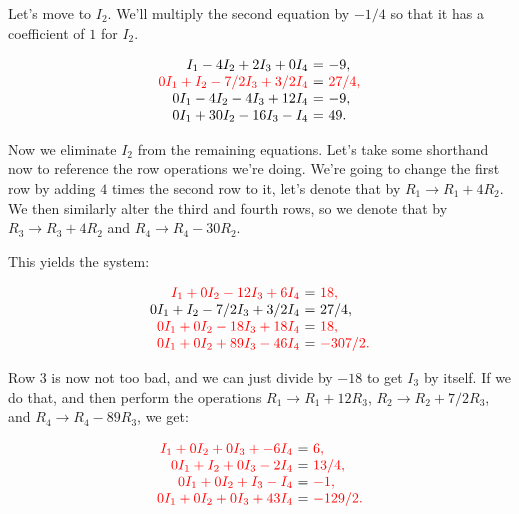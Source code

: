 \documentclass{ximera}
\begin{document}
\begin{exploration}
\begin{example}
\begin{solution}
  Let's move to $I_2$. We'll multiply the second equation by $-1/4$ so that it has a coefficient of $1$ for $I_2$.

  \begin{equation*}
    \begin{array}{r@{~}c@{~}l}
      I_1-4I_2+2I_3+0I_4&=&-9, \\
      \color{red}0I_1+I_2 - 7/2I_3 + 3/2I_4 &=& \color{red}27/4, \\
      0I_1 - 4I_2 - 4I_3 + 12I_4 &=& -9, \\
      0I_1+30I_2 - 16I_3 - I_4 &=& 49.
    \end{array}
  \end{equation*}

  Now we eliminate $I_2$ from the remaining equations. Let's take some shorthand now to reference the row operations we're doing. We're going to change the first row by adding $4$ times the second row to it, let's denote that by $R_1 \rightarrow R_1 + 4R_2$. We then similarly alter the third and fourth rows, so we denote that by $R_3 \rightarrow R_3 + 4R_2$ and $R_4 \rightarrow R_4 - 30R_2$.

  This yields the system:

  \begin{equation*}
    \begin{array}{r@{~}c@{~}l}
      \color{red}I_1+0I_2-12I_3+6I_4&=&\color{red}18, \\
      0I_1+I_2 - 7/2I_3 + 3/2I_4 &=& 27/4, \\
      \color{red}0I_1 + 0I_2 - 18I_3 + 18I_4 &=& \color{red}18, \\
      \color{red}0I_1+0I_2 + 89I_3 - 46I_4 &=& \color{red}-307/2.
    \end{array}
  \end{equation*}

  Row $3$ is now not too bad, and we can just divide by $-18$ to get $I_3$ by itself. If we do that, and then perform the operations $R_1 \rightarrow R_1 + 12R_3$, $R_2 \rightarrow R_2 + 7/2R_3$, and $R_4 \rightarrow R_4 - 89R_3$, we get:

  \begin{equation*}
    \begin{array}{r@{~}c@{~}l}
      \color{red}I_1+0I_2+0I_3+-6I_4&=&\color{red}6, \\
      \color{red}0I_1+I_2 + 0I_3 -2I_4 &=& \color{red}13/4, \\
      \color{red}0I_1 + 0I_2 + I_3 - I_4 &=& \color{red}-1, \\
      \color{red}0I_1+0I_2 + 0I_3 + 43I_4 &=& \color{red}-129/2.
    \end{array}
  \end{equation*}


\end{solution}
\end{example}
\end{exploration}
\end{document}
